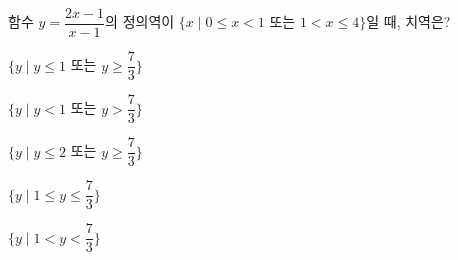 \hspace*{2mm}\begin{minipage}[t]{\dimexpr\linewidth-2mm\relax}\vspace{0pt}
함수 $y=\dfrac{2x-1}{x-1}$의 정의역이 $\{x \mid 0\le x<1$ 또는 $1<x\le 4\}$일 때, 치역은?
\begin{choicesv}{\rule[-3ex]{0pt}{8ex}$\{y \mid y\le 1$ 또는 $y\ge\dfrac{7}{3}\}$}{\rule[-3ex]{0pt}{8ex}$\{y \mid y<1$ 또는 $y>\dfrac{7}{3}\}$}{\rule[-3ex]{0pt}{8ex}$\{y \mid y\le 2$ 또는 $y\ge\dfrac{7}{3}\}$}{\rule[-3ex]{0pt}{8ex}$\{y \mid 1\le y\le\dfrac{7}{3}\}$}{\rule[-3ex]{0pt}{8ex}$\{y \mid 1<y<\dfrac{7}{3}\}$}\end{choicesv}\end{minipage}
